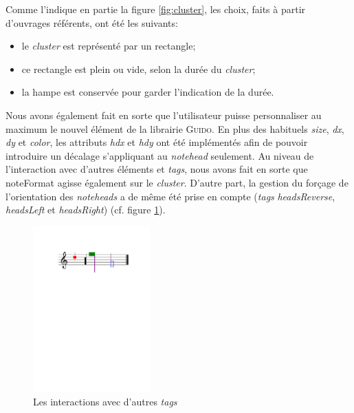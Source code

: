 \documentclass{article}
\newenvironment{gmncode}	{\vspace{-2mm}\small\verbatim}{\endverbatim\vspace{-2mm}}
\newcommand{\guido}			{\textsc{Guido}}
\begin{document}
Comme l'indique en partie la figure \ref{fig:cluster}, les choix, faits à partir d'ouvrages référents, ont été les suivants:
\begin{itemize}
	\item le \emph{cluster} est représenté par un rectangle;
	\item ce rectangle est plein ou vide, selon la durée du \emph{cluster};
	\item la hampe est conservée pour garder l'indication de la durée.
\end{itemize}

Nous avons également fait en sorte que l'utilisateur puisse personnaliser au maximum le nouvel élément de la librairie \guido. En plus des habituels \emph{size}, \emph{dx}, \emph{dy} et \emph{color}, les attributs \emph{hdx} et \emph{hdy} ont été implémentés afin de pouvoir introduire un décalage s'appliquant au \emph{notehead} seulement. Au niveau de l'interaction avec d'autres éléments et \emph{tags}, nous avons fait en sorte que noteFormat agisse également sur le \emph{cluster}. D'autre part, la gestion du forçage de l'orientation des \emph{noteheads} a de même été prise en compte (\emph{tags} \emph{headsReverse}, \emph{headsLeft} et \emph{headsRight}) (cf. figure \ref{fig:clusterInteractions}).

%
\begin{figure}[h]
\centering
\begin{gmncode}
[
  \cluster<color="red", hdx=1, hdy=3>({a})
  \cluster<size=0.5>({f,c2})
  \noteFormat<color="purple">
  \headsReverse
  \cluster<color="green", size=2>({f, g2})
  \cluster<"blue">({d1/2, g})
]
\end{gmncode}
\includegraphics[width=45mm]{img/partitions/clusterInteractions.pdf}
\caption{Les interactions avec d'autres \emph{tags}}
\label{fig:clusterInteractions}
\end{figure}
%


\end{document}
